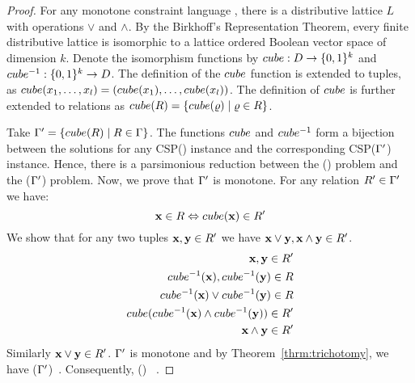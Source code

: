 \begin{proof}
For any monotone constraint language \mrelset, there is a distributive lattice \(L\) with operations
\(\vee\) and \(\wedge\)\@. By the Birkhoff's Representation Theorem, every finite distributive lattice
is isomorphic to a lattice ordered Boolean vector space of dimension \(k\)\@.
Denote the isomorphism functions by \(cube: D \to \{{0,1}\}^k\) and 
\(cube^{-1} : \{{0,1}\}^k\to D\)\@. The definition of the \(cube\) function
is extended to tuples, as \(cube(x_1,\dotsc,x_l)=(cube(x_1),\dotsc,cube(x_l))\)\@.
The definition of \(cube\) is further extended to relations as 
\(cube(R) = \{{cube(\varrho) \mid \varrho \in R}\}\)\@.

Take \(\Gamma'=\{{cube(R)\mid R\in \Gamma}\}\)\@. The functions \(cube\) and
\(cube^{-1}\) form a bijection between the solutions for any CSP(\mrelset) instance and the 
corresponding CSP(\(\Gamma'\)) instance. Hence, there is a parsimonious reduction between 
the \ccsp(\mrelset) problem and the \ccsp(\(\Gamma'\)) problem. Now, we prove that
\(\Gamma'\) is monotone. For any relation \(R' \in \Gamma'\) we have:
\[\textbf{x} \in R \Leftrightarrow cube(\textbf{x}) \in R'\]
We show that for any two tuples \(\textbf{x},\textbf{y}\in R'\) we have 
\(\textbf{x} \vee \textbf{y}, \textbf{x}\wedge\textbf{y}\in R'\).
\begin{eqnarray*}
\textbf{x},\textbf{y} \in R'  \\
cube^{-1}(\textbf{x}),cube^{-1}(\textbf{y})\in R  \\
cube^{-1}(\textbf{x}) \vee cube^{-1}(\textbf{y}) \in R  \\
cube(cube^{-1}(\textbf{x})\wedge cube^{-1}(\textbf{y}))\in R' \\
\textbf{x} \wedge \textbf{y} \in R' \\
\end{eqnarray*}
Similarly \(\textbf{x} \vee \textbf{y} \in R'\)\@.
\(\Gamma'\) is monotone and by Theorem~\ref{thrm:trichotomy}, we have 
\ccsp(\(\Gamma'\))\maple\ \cbis\@. Consequently, \ccsp(\mrelset) \maple\ \cbis\@.
\end{proof}

